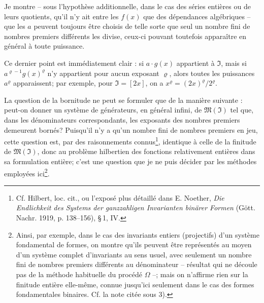 Je montre -- sous l'hypothèse additionnelle, dans le cas des séries entières ou de leurs quotients, qu'il n'y ait entre les $f(x)$ que des dépendances algébriques -- que les $a$ peuvent toujours être choisis de telle sorte que seul un nombre fini de nombres premiers différents les divise, ceux-ci pouvant toutefois apparaître en général à toute puissance.

Ce dernier point est immédiatement clair : si $a\cdot g(x)$ appartient à $\mathfrak{I}$, mais si $a^{\varrho-1}g(x)^{\varrho}$ n'y appartient pour aucun exposant $\varrho$, alors toutes les puissances $a^{\varrho}$ apparaissent; par exemple, pour $\mathfrak{I}=[2x]$, on a $x^{\varrho}=(2x)^{\varrho}/2^{\varrho}$.

La question de la bornitude ne peut se formuler que de la manière suivante : peut-on donner un système de générateurs, en général infini, de $\mathfrak{M}(\mathfrak{I})$ tel que, dans les dénominateurs correspondants, les exposants des nombres premiers demeurent bornés? Puisqu'il n'y a qu'un nombre fini de nombres premiers en jeu, cette question est, par des raisonnements connus\footnote{Cf. Hilbert, loc. cit., ou l'exposé plus détaillé dans E. Noether, \emph{Die Endlichkeit des Systems der ganzzahligen Invarianten binärer Formen} (Gött. Nachr. 1919, p. 138--156), \S\,1, IV.}, identique à celle de la finitude de $\mathfrak{M}(\mathfrak{I})$, donc au problème hilbertien des fonctions relativement entières dans sa formulation entière; c'est une question que je ne puis décider par les méthodes employées ici\footnote{Ainsi, par exemple, dans le cas des invariants entiers (projectifs) d'un système fondamental de formes, on montre qu'ils peuvent être représentés au moyen d'un système complet d'invariants au sens usuel, avec seulement un nombre fini de nombres premiers différents au dénominateur -- résultat qui ne découle pas de la méthode habituelle du procédé $\Omega$ --; mais on n'affirme rien sur la finitude entière elle-même, connue jusqu'ici seulement dans le cas des formes fondamentales binaires. Cf. la note citée sous 3).}.

